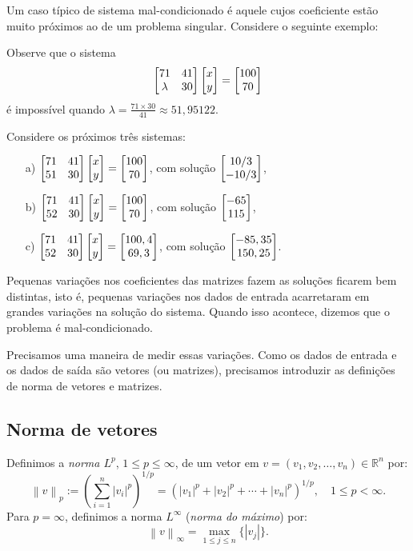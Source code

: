 Um caso típico de sistema mal-condicionado é aquele cujos coeficiente estão muito próximos ao de um problema singular. Considere o seguinte exemplo:

\begin{ex}\label{ex:sist-mal-cond} Observe que o sistema
\begin{equation}
\begin{bmatrix} 71&41\\\lambda&30 \end{bmatrix}\begin{bmatrix} x \\y \end{bmatrix}=\begin{bmatrix} 100 \\70 \end{bmatrix}
\end{equation}
é impossível quando $\lambda= \frac{71\times 30}{41}\approx 51,95122$.

Considere os próximos três sistemas:
\begin{enumerate}
 \item [a)] $\begin{bmatrix} 71&41\\51&30 \end{bmatrix}\begin{bmatrix} x \\y \end{bmatrix}=\begin{bmatrix} 100 \\70 \end{bmatrix}$, com solução $\begin{bmatrix} 10/3 \\-10/3 \end{bmatrix}$,
 \item [b)] $\begin{bmatrix} 71&41\\52&30 \end{bmatrix}\begin{bmatrix} x \\y \end{bmatrix}=\begin{bmatrix} 100 \\70 \end{bmatrix}$, com solução $\begin{bmatrix} -65 \\115 \end{bmatrix}$,
 \item [c)] $\begin{bmatrix} 71&41\\52&30 \end{bmatrix}\begin{bmatrix} x \\y \end{bmatrix}=\begin{bmatrix} 100,4 \\69,3 \end{bmatrix}$, com solução $\begin{bmatrix} -85,35 \\150,25 \end{bmatrix}$.
\end{enumerate}

Pequenas variações nos coeficientes das matrizes fazem as soluções ficarem bem distintas, isto é, pequenas variações nos dados de entrada acarretaram em grandes variações na solução do sistema. Quando isso acontece, dizemos que o problema é mal-condicionado.
\end{ex}

Precisamos uma maneira de medir essas variações. Como os dados de entrada e os dados de saída são vetores (ou matrizes), precisamos introduzir as definições de norma de vetores e matrizes.

\subsection{Norma de vetores}

Definimos a \emph{norma $L^p$}, $1 \leq p \leq \infty$, de um vetor em $v = (v_1, v_2, \ldots, v_n)\in \mathbb{R}^n$ por:
\begin{equation*}
  \left\|v\right\|_p := \left(\sum_{i=1}^n \left |v_i\right |^p\right)^{1/p} = \left(\left |v_1\right |^p+\left |v_2\right |^p+ \cdots +\left |v_n\right |^p\right)^{1/p},\quad 1\leq p < \infty.
\end{equation*}
Para $p=\infty$, definimos a norma $L^{\infty}$ (\emph{norma do máximo}) por:
\begin{equation*}
  \left\|v\right\|_\infty = \max_{1\leq j\leq n} \{\left |v_j\right |\}.
\end{equation*}

